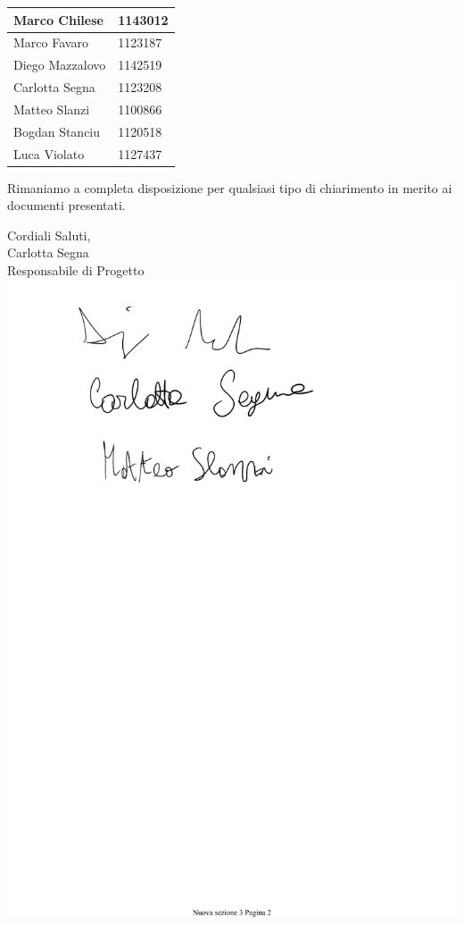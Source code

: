\documentclass[11pt, a4paper]{letter} %
\begin{document}
\begin{letter}
\begin{center}
\begin{longtable}[c]{|m{}m{}|}
\hline
Marco Chilese & 1143012\\
\hline
\rowcolor{grigio}Marco Favaro & 1123187\\ 
\hline
Diego Mazzalovo & 1142519\\
\hline
\rowcolor{grigio}Carlotta Segna & 1123208\\
\hline
Matteo Slanzi & 1100866\\
\hline
\rowcolor{grigio}Bogdan Stanciu  & 1120518\\
\hline
Luca Violato & 1127437\\
\hline
\end{longtable}
\end{center}

Rimaniamo a completa disposizione per qualsiasi tipo di chiarimento in merito ai documenti presentati.

\closing{Cordiali Saluti,\\
Carlotta Segna\\
Responsabile di Progetto
\includegraphics[scale=0.5]{images/CarlottaSegna.pdf}}


\end{letter}
\end{document}
